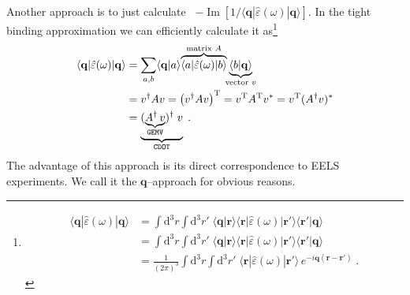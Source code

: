 \documentclass[a4paper,12pt]{article}
\begin{document}
    Another approach is to just calculate \ $-\operatorname{Im}[1 / \langle\mathbf{q} |\hat\varepsilon(\omega)| \mathbf{q}\rangle]$. In the tight binding approximation we can efficiently calculate it as\footnote{ %
        \begin{equation*}
        \begin{aligned}
            \langle\mathbf{q} |\hat\varepsilon(\omega)| \mathbf{q}\rangle 
                &= \int\!\!\text{d}^3r \!\!\!\int\!\!\text{d}^3r'\; \langle\mathbf{q}|\mathbf{r}\rangle \langle\mathbf{r}|\hat\varepsilon(\omega)|\mathbf{r'}\rangle \langle\mathbf{r'}|\mathbf{q}\rangle \\
                &= \int\!\!\text{d}^3r \!\!\!\int\!\!\text{d}^3r'\; \langle\mathbf{q}|\mathbf{r}\rangle \langle\mathbf{r}|\hat\varepsilon(\omega)|\mathbf{r'}\rangle \langle\mathbf{r'}|\mathbf{q}\rangle \\
                &= \frac{1}{(2\pi)^3} \int\!\!\text{d}^3r \!\!\!\int\!\!\text{d}^3r'\; \langle\mathbf{r} |\hat\varepsilon(\omega)| \mathbf{r'}\rangle\, e^{-i\mathbf{q}(\mathbf{r} - \mathbf{r'})} \; .
        \end{aligned}
        \end{equation*}
    }
    \begin{equation*}
    \begin{aligned}
        \langle\mathbf{q} |\hat\varepsilon(\omega)| \mathbf{q}\rangle 
            &= \sum_{a,b} \langle\mathbf{q}|a\rangle \!\overbrace{\langle a|\hat\varepsilon(\omega)|b\rangle}^{\text{matrix } A} \!\!\underbrace{\langle b|\mathbf{q}\rangle}_{\text{vector } v} \\
            &= v^\dagger A v = \left( v^\dagger A v \right)^\text{T} = v^\text{T} A^\text{T} v^* 
             = v^\text{T} (A^\dagger v)^* \\
            &= \underbrace{(\underbrace{A^\dagger \, v}_{\text{\texttt{GEMV}}})^\dagger  \; v}_\text{\texttt{CDOT}}\;.
    \end{aligned}
    \end{equation*}
    The advantage of this approach is its direct correspondence to EELS experiments. We call it the $\mathbf{q}$--approach for obvious reasons.
    
\end{document}
